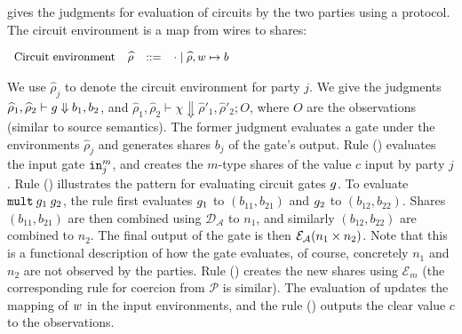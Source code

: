  gives the judgments for evaluation of circuits by
the two parties using a \mpc protocol. The circuit environment  is a
map from wires to shares:

\vspace{0.2cm}
$
\small
\begin{array}{rrcl}
    \text{\small{Circuit environment}} & \widehat\rho &::=& \cdot \mid \widehat\rho,w \mapsto b\\
\end{array}
$
\vspace{0.2cm}

We use $\widehat\rho_j$ to denote the circuit environment for party $j.$ 
We give the 
judgments $\widehat{\rho}_{1}, \widehat{\rho}_{2} \vdash {g}
\Downarrow b_{1}, b_{2}$, and $\widehat{\rho}_{1}, \widehat{\rho}_{2}
\vdash \chi \Downarrow \widehat{\rho}'_{1}, \widehat{\rho}'_{2}; O$,
where $O$ are the observations (similar to source semantics). 
The former judgment evaluates a gate under the environments
$\widehat{\rho}_j$ and generates shares $b_j$ of the gate's output.
Rule ({}) evaluates the input gate ${\mathtt{in}}^{m}_{j}$, and
creates the $m$-type shares of the value $c$ input by party $j$.
Rule ({}) illustrates the pattern for evaluating circuit
gates ${g}$. To evaluate ${\mathtt{mult}}\:{g}_{1}\:{g}_{2}$, the
rule first evaluates ${g}_{1}$ to $(b_{11}, b_{21})$ and
${g}_{2}$ to $(b_{12}, b_{22})$. Shares $(b_{11}, b_{21})$ are then
combined using $\mathcal{D_{\mathcal{A}}}$ to $n_{1}$, and similarly
$(b_{12}, b_{22})$ are combined to $n_{2}$. The final output of the
 gate is then $\mathcal{E}_{\mathcal{A}}(n_{1} \times n_{2})$. Note
that this is a functional description of how the  gate
evaluates, of course, concretely $n_{1}$ and $n_{2}$ are not observed
by the parties. Rule ({}) creates the new shares using
$\mathcal{E}_m$ (the corresponding rule for coercion from
$\mathcal{P}$ is similar). The evaluation
of  updates the mapping of $w$ in the input environments, and
the rule ({}) outputs the clear value $c$ to the
observations.




